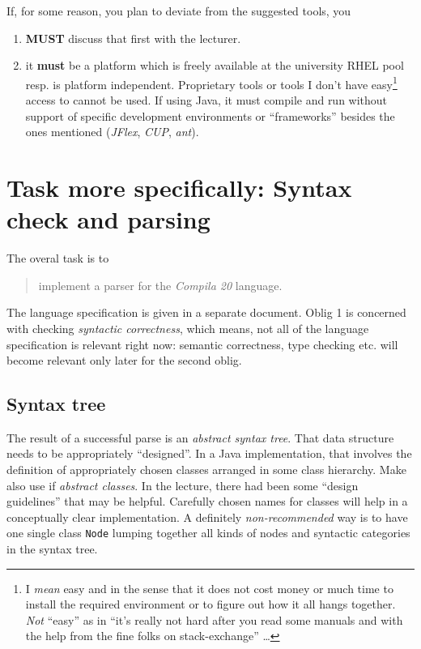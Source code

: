 \documentclass[10pt,freeform]{handout}[2014/08/13]
\begin{document}
If, for some reason, you plan to deviate from the suggested tools, you
\begin{enumerate}
\item \textbf{MUST} discuss that first with the lecturer.
\item it \textbf{must} be a platform which is freely available at the
  university RHEL pool resp. is platform independent. Proprietary tools or
  tools I don't have easy\footnote{I \emph{mean} easy and in the sense that
    it does not cost money or much time to install the required environment
    or to figure out how it all hangs together. \emph{Not} ``easy'' as in
    ``it's really not hard after you read some manuals and with the help
    from the fine folks on stack-exchange'' \ldots} access to cannot be
  used. If using Java, it must compile and run without support of specific
  development environments or ``frameworks'' besides the ones mentioned
  (\textsl{JFlex}, \textsl{CUP}, \textsl{ant}).
\end{enumerate}



\section{Task more specifically: Syntax check and parsing}
\label{sec:task-more-spec}


The overal task is to 

\begin{quote}
  implement a parser for the \textsl{Compila 20} language.
\end{quote}
The language specification is given in a separate document. Oblig 1 is
concerned with checking \emph{syntactic correctness}, which means, not all
of the language specification is relevant right now: semantic correctness,
type checking etc. will become relevant only later for the second oblig.


\subsection{Syntax tree}
\label{sec:syntax-tree}

The result of a successful parse is an \emph{abstract syntax tree}. That
data structure needs to be appropriately ``designed''. In a Java
implementation, that involves the definition of appropriately chosen
classes arranged in some class hierarchy. Make also use if \emph{abstract
  classes}. In the lecture, there had been some ``design guidelines'' that
may be helpful. Carefully chosen names for classes will help in a
conceptually clear implementation. A definitely \emph{non-recommended} way
is to have one single class \texttt{Node} lumping together all kinds of
nodes and syntactic categories in the syntax tree.
\end{document}

